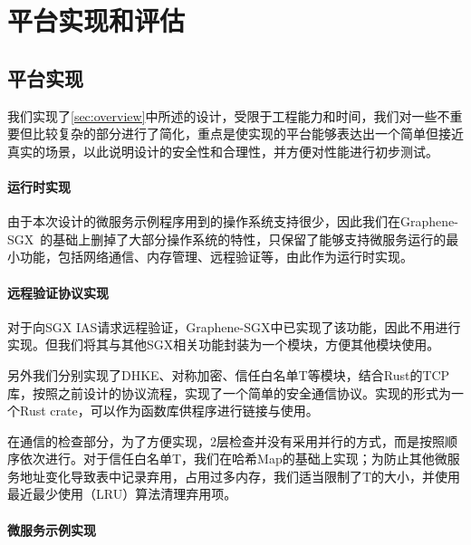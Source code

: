 \section{平台实现和评估}\label{sec:implimentation-evaluation}

\subsection{平台实现}

我们实现了\cref{sec:overview}中所述的设计，受限于工程能力和时间，我们对一些不重要但比较复杂的部分进行了简化，重点是使实现的平台能够表达出一个简单但接近真实的场景，以此说明设计的安全性和合理性，并方便对性能进行初步测试。%

\paragraph{运行时实现}

由于本次设计的微服务示例程序用到的操作系统支持很少，因此我们在Graphene-SGX~\cite{tsai2017graphene}的基础上删掉了大部分操作系统的特性，只保留了能够支持微服务运行的最小功能，包括网络通信、内存管理、远程验证等，由此作为运行时实现。

\paragraph{远程验证协议实现}

对于向SGX IAS请求远程验证，Graphene-SGX中已实现了该功能，因此不用进行实现。但我们将其与其他SGX相关功能封装为一个模块，方便其他模块使用。

另外我们分别实现了DHKE、对称加密、信任白名单T等模块，结合Rust的TCP库，按照之前设计的协议流程，实现了一个简单的安全通信协议。实现的形式为一个Rust crate，可以作为函数库供程序进行链接与使用。

在通信的检查部分，为了方便实现，2层检查并没有采用并行的方式，而是按照顺序依次进行。对于信任白名单T，我们在哈希Map的基础上实现；为防止其他微服务地址变化导致表中记录弃用，占用过多内存，我们适当限制了T的大小，并使用最近最少使用（LRU）算法清理弃用项。

\paragraph{微服务示例实现}

